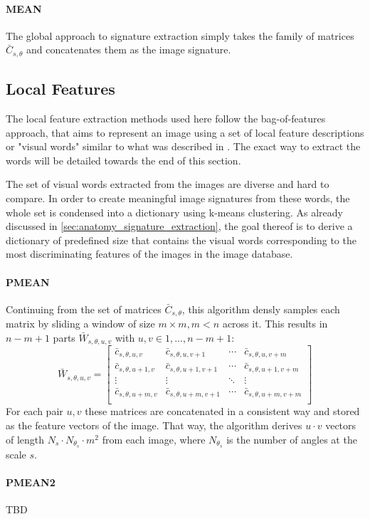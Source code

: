 \paragraph{MEAN}

The global approach to signature extraction simply takes the family of matrices
$\bar{C}_{s, \theta}$ and concatenates them as the image signature.

\subsection{Local Features}

The local feature extraction methods used here follow the bag-of-features
approach, that aims to represent an image using a set of local feature
descriptions or "visual words" similar to what was described in
\autocite{sivic_video_2003}. The exact way to extract the words will be
detailed towards the end of this section.

The set of visual words extracted from the images are diverse and hard to
compare. In order to create meaningful image signatures from these words, the
whole set is condensed into a dictionary using k-means clustering. As already
discussed in \ref{sec:anatomy_signature_extraction}, the goal thereof is to
derive a dictionary of predefined size that contains the visual words
corresponding to the most discriminating features of the images in the image
database.

\paragraph{PMEAN}

Continuing from the set of matrices $\bar{C}_{s, \theta}$, this algorithm
densly samples each matrix by sliding a window of size $m \times m, m < n$
across it. This results in $n - m + 1$ parts $\bar{W}_{s, \theta, u, v}$ with
$u, v \in 1, \dots, n - m + 1$:
\begin{equation*}
    \bar{W}_{s,\theta,u,v} =
    \begin{bmatrix}
        \bar{c}_{s,\theta,u,v} & \bar{c}_{s,\theta,u,v+1} & \cdots & \bar{c}_{s,\theta,u,v+m} \\
        \bar{c}_{s,\theta,u+1,v} & \bar{c}_{s,\theta,u+1,v+1} & \cdots & \bar{c}_{s,\theta,u+1,v+m} \\
        \vdots  & \vdots  & \ddots & \vdots  \\
        \bar{c}_{s,\theta,u+m,v} & \bar{c}_{s,\theta,u+m,v+1} & \cdots & \bar{c}_{s,\theta,u+m,v+m} \\
    \end{bmatrix}
\end{equation*}
For each pair $u, v$ these matrices are concatenated in a consistent way and
stored as the feature vectors of the image. That way, the algorithm derives $u
\cdot v$ vectors of length $N_s \cdot N_{\theta_s} \cdot m^2$ from each image,
where $N_{\theta_s}$ is the number of angles at the scale $s$.

\paragraph{PMEAN2}

TBD
